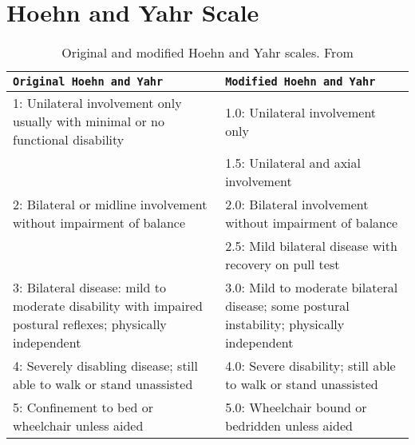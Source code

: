 \newpage
\section{Hoehn and Yahr Scale} \label{app:HY}
\begin{table}[]
    \centering
    \begin{tabularx}{\textwidth}{X|X}
        \texttt{Original Hoehn and Yahr} & \texttt{Modified Hoehn and Yahr}\\\hline
         1: Unilateral involvement only usually with minimal or no functional disability & 1.0: Unilateral involvement only \\
         & 1.5: Unilateral and axial involvement \\
         2: Bilateral or midline involvement without impairment of balance & 2.0: Bilateral involvement without impairment of balance \\
         & 2.5: Mild bilateral disease with recovery on pull test \\
         3: Bilateral disease: mild to moderate disability with impaired postural reflexes; physically independent & 3.0: Mild to moderate bilateral disease; some postural instability; physically independent \\
         4: Severely disabling disease; still able to walk or stand unassisted & 4.0: Severe disability; still able to walk or stand unassisted \\
         5: Confinement to bed or wheelchair unless aided & 5.0: Wheelchair bound or bedridden unless aided \\
    \end{tabularx}
    \caption{Original and modified Hoehn and Yahr scales. From \cite{Goetz2004}}
    \label{tab:HY}
\end{table}